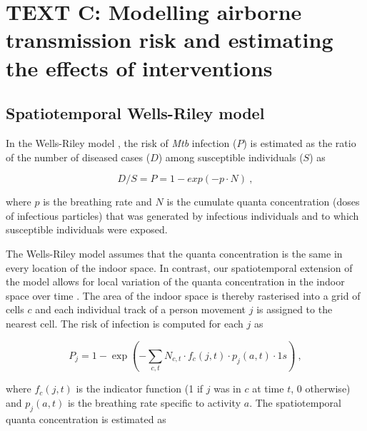 \documentclass[11pt]{article}
\begin{document}

\section{TEXT C: Modelling airborne transmission risk and estimating the effects of interventions}\label{text-c}

\subsection{Spatiotemporal Wells-Riley model}\label{spatiotemporal-wells-riley-model}

In the Wells-Riley model \cite{riley1978AmJEpidemiol}, the risk of \emph{Mtb} infection (\(P\)) is estimated as the ratio of the number of diseased cases (\(D\)) among susceptible individuals (\(S\)) as

\[D/S = P = 1 - exp( - p \cdot N)~,\]

where \(p\) is the breathing rate and \(N\) is the cumulate quanta concentration (doses of infectious particles) that was generated by infectious individuals and to which susceptible individuals were exposed.

The Wells-Riley model assumes that the quanta concentration is the same in every location of the indoor space. In contrast, our spatiotemporal extension of the model allows for local variation of the quanta concentration in the indoor space over time \cite{banholzer2025PLOSComputBiol}. The area of the indoor space is thereby rasterised into a grid of cells \(c\) and each individual track of a person movement \(j\) is assigned to the nearest cell. The risk of infection is computed for each \(j\) as

\[P_{j} = 1 - \exp( - \sum_{c,t}^{}N_{c,t} \cdot f_{c}(j,t) \cdot p_{j}(a,t) \cdot 1s)~,\]

where \(f_{c}(j,t)\) is the indicator function (1 if \(j\) was in \(c\) at time \(t\), 0 otherwise) and \(p_{j}(a,t)\) is the breathing rate specific to activity \(a\). The spatiotemporal quanta concentration is estimated as
\end{document}
